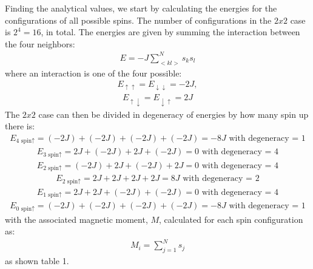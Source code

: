 \documentclass[12pt,english,a4paper]{article}
\begin{document}
Finding the analytical values, we start by calculating the energies for the configurations of all possible spins. The number of configurations in the $2x2$ case is  $2^4 = 16$, in total. The energies are given by summing the interaction between the four neighbors:
\begin{align*}
    E = -J \sum_{<kl>}^N s_ks_l 
\end{align*}
where an interaction is one of the four possible:
\begin{align*}
    E_{\uparrow \uparrow} = E_{\downarrow \downarrow} = -2J, 
\end{align*}
\begin{align*}
    E_{\uparrow \downarrow} = E_{\downarrow \uparrow} = 2J
\end{align*}
The $2x2$ case can then be divided in degeneracy of energies by how many spin up there is: 
\begin{align*}
    E_{\text{4 spin}\uparrow} = (-2J) + (-2J) + (-2J) + (-2J) = -8J \text{ with degeneracy = 1}
\end{align*}
\begin{align*}
    E_{\text{3 spin}\uparrow} = 2J + (-2J) + 2J + (-2J) = 0 \text{ with degeneracy = 4}
\end{align*}
\begin{align*}
    E_{\text{2 spin}\uparrow} = (-2J) + 2J + (-2J) + 2J = 0 \text{ with degeneracy = 4}
\end{align*}
\begin{align*}
    E_{\text{2 spin}\uparrow} = 2J + 2J + 2J + 2J = 8J \text{ with degeneracy = 2}
\end{align*}
\begin{align*}
    E_{\text{1 spin}\uparrow} = 2J + 2J + (-2J) + (-2J) = 0 \text{ with degeneracy = 4}
\end{align*}
\begin{align*}
    E_{\text{0 spin}\uparrow} = (-2J) + (-2J) + (-2J) + (-2J) = -8J \text{ with degeneracy = 1}
\end{align*}
with the associated magnetic moment, $M$, calculated for each spin configuration as:
\begin{align*}
    M_{i}=\sum_{j=1}^{N} s_{j}
\end{align*}
as shown table 1.
\end{document}
